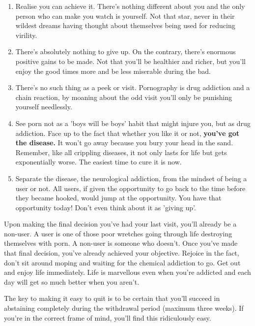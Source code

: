 \documentclass[easypeasy]{subfiles}
\begin{document}
\begin{enumerate}
  \item Realise you can achieve it. There's nothing different about you and the only person who can make you watch is yourself. Not that star, never in their wildest dreams having thought about themselves being used for reducing virility.
  \item There's absolutely nothing to give up. On the contrary, there's enormous positive gains to be made. Not that you'll be healthier and richer, but you'll enjoy the good times more and be less miserable during the bad.
  \item There's no such thing as a peek or visit. Pornography is drug addiction and a chain reaction, by moaning about the odd visit you'll only be punishing yourself needlessly.
  \item See porn not as a 'boys will be boys' habit that might injure you, but as drug addiction. Face up to the fact that whether you like it or not, \textbf{you've got the disease.} It won't go away because you bury your head in the sand. Remember, like all crippling diseases, it not only lasts for life but gets exponentially worse. The easiest time to cure it is now.
  \item Separate the disease, the neurological addiction, from the mindset of being a user or not. All users, if given the opportunity to go back to the time before they became hooked, would jump at the opportunity. You have that opportunity today! Don't even think about it as 'giving up'.

\end{enumerate}

Upon making the final decision you've had your last visit, you'll already be a non-user. A user is one of those poor wretches going through life destroying themselves with porn. A non-user is someone who doesn't. Once you've made that final decision, you've already achieved your objective. Rejoice in the fact, don't sit around moping and waiting for the chemical addiction to go. Get out and enjoy life immediately. Life is marvellous even when you're addicted and each day will get so much better when you aren't.

The key to making it easy to quit is to be certain that you'll succeed in abstaining completely during the withdrawal period (maximum three weeks). If you're in the correct frame of mind, you'll find this ridiculously easy.
\end{document}
